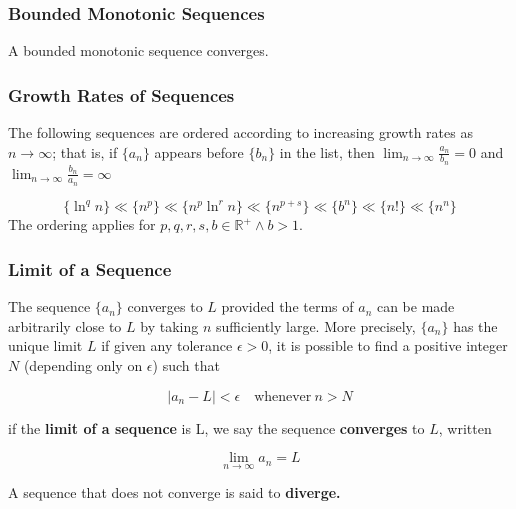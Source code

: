 \subsubsection{Bounded Monotonic Sequences}
A bounded monotonic sequence converges.

\subsubsection{Growth Rates of Sequences}
The following sequences are ordered according to increasing growth rates as $n \rightarrow \infty$; that is, if $\{ a_n \}$ appears before $\{ b_n \}$ in the list, then $\lim _{n \rightarrow \infty} \frac{a_n}{b_n} = 0$ and $\lim _{n \rightarrow \infty} \frac{b_n}{a_n} = \infty$

\begin{equation}
    \{ \ln^q n \} \ll \{ n^p \} \ll \{ n^p \ln^r n \} \ll \{ n^{p + s} \} \ll \{ b^n \} \ll \{ n! \} \ll \{ n^n \}
\end{equation}
The ordering applies for $p, q, r, s, b \in \mathbb{R}^+ \wedge b > 1$.

\subsubsection{Limit of a Sequence}
The sequence $\{ a_n \}$ converges to $L$ provided the terms of $a_n$ can be made arbitrarily close to $L$ by taking $n$ sufficiently large. More precisely, $\{ a_n \}$ has the unique limit $L$ if given any tolerance $\epsilon > 0$, it is possible to find a positive integer $N$ (depending only on $\epsilon$) such that

\begin{equation}
    | a_n - L | < \epsilon \quad \text{whenever} \ n > N
\end{equation}

if the \textbf{limit of a sequence} is L, we say the sequence \textbf{converges} to $L$, written

\begin{equation}
    \lim _{n \rightarrow \infty} a_n = L
\end{equation}

A sequence that does not converge is said to \textbf{diverge.}
